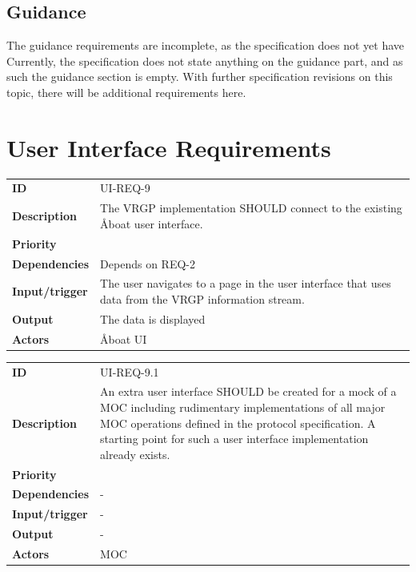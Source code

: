 \subsection{Guidance}

The guidance requirements are incomplete, as the specification does not yet have 
Currently, the specification does not state anything on the guidance part, and as such the guidance section is empty. With further specification revisions on this topic, there will be additional requirements here.

\section{User Interface Requirements}\label{sec:ui-requirements}

\begin{table}[H]
	\centering
	\begin{tabularx}{\textwidth}{ l X }
		\rowcolor[HTML]{E7E7E7}
		\textbf{ID} & UI-REQ-9 \\
		\textbf{Description} & The VRGP implementation SHOULD connect to the existing Åboat user interface. \\
		\rowcolor[HTML]{E7E7E7}
		\textbf{Priority} & \prioavg \\
		\textbf{Dependencies} & Depends on REQ-2 \\
		\rowcolor[HTML]{E7E7E7}
		\textbf{Input/trigger} & The user navigates to a page in the user interface that uses data from the VRGP information stream. \\
		\textbf{Output} & The data is displayed \\
		\rowcolor[HTML]{E7E7E7}
		\textbf{Actors} & Åboat UI \\
	\end{tabularx}
	\label{table:ui-req-9}
\end{table}

\begin{table}[H]
	\centering
	\begin{tabularx}{\textwidth}{ l X }
		\rowcolor[HTML]{E7E7E7}
		\textbf{ID} & UI-REQ-9.1 \\
		\textbf{Description} & An extra user interface SHOULD be created for a mock of a MOC including rudimentary implementations of all major MOC operations defined in the protocol specification. A starting point for such a user interface implementation already exists. \\
		\rowcolor[HTML]{E7E7E7}
		\textbf{Priority} & \priolow \\
		\textbf{Dependencies} & - \\
		\rowcolor[HTML]{E7E7E7}
		\textbf{Input/trigger} & - \\
		\textbf{Output} & - \\
		\rowcolor[HTML]{E7E7E7}
		\textbf{Actors} & MOC \\
	\end{tabularx}
	\label{table:ui-req-9.1}
\end{table}

